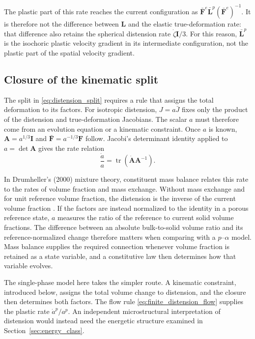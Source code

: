 \documentclass[11pt]{article}
\newcommand{\mbf}[1]{\mathbf{#1}}
\newcommand{\tr}{\operatorname{tr}}
\begin{document}
The plastic part of this rate reaches the current configuration as
\(\bar{\mbf F}^e\bar{\mbf L}^p(\bar{\mbf F}^e)^{-1}\). It is therefore not the
difference between \(\mbf L\) and the elastic true-deformation rate: that
difference also retains the spherical distension rate \(\dot\zeta\mbf I/3\).
For this reason, \(\bar{\mbf L}^{p}\) is the isochoric plastic velocity
gradient in its intermediate configuration, not the plastic part of the
spatial velocity gradient.

\subsection{Closure of the kinematic split}
\label{sec:kinematic_closure}

The split in \eqref{eq:distension_split} requires a rule that assigns the
total deformation to its factors. For isotropic distension, \(J=a\bar J\) fixes
only the product of the distension and true-deformation Jacobians. The scalar
\(a\) must therefore come from an evolution equation or a kinematic
constraint. Once \(a\) is known, \(\mbf A=a^{1/3}\mbf I\) and
\(\bar{\mbf F}=a^{-1/3}\mbf F\) follow. Jacobi's determinant identity applied
to \(a=\det\mbf A\) gives the rate relation
\begin{equation*}
	\frac{\dot a}{a}
	=\tr\left(\dot{\mbf A}\mbf A^{-1}\right).
\end{equation*}

In Drumheller's (2000) mixture theory, constituent mass balance relates this
rate to the rates of volume fraction and mass exchange. Without mass exchange
and for unit reference volume fraction, the distension is the inverse of the
current volume fraction \cite[eq.~(36)]{drumheller2000}. If the factors are
instead normalized to the identity in a porous reference state, \(a\) measures
the ratio of the reference to current solid volume fractions. The difference
between an absolute bulk-to-solid volume ratio and its reference-normalized
change therefore matters when comparing with a \(p\)--\(\alpha\) model. Mass
balance supplies the required connection whenever volume fraction is retained
as a state variable, and a constitutive law then determines how that variable
evolves.

The single-phase model here takes the simpler route. A kinematic constraint,
introduced below, assigns the total volume change to distension, and the
closure then determines both factors. The flow rule
\eqref{eq:finite_distension_flow} supplies the plastic rate
\(\dot a^p/a^p\). An independent microstructural interpretation of distension
would instead need the energetic structure examined in
Section~\ref{sec:energy_class}.
\end{document}
